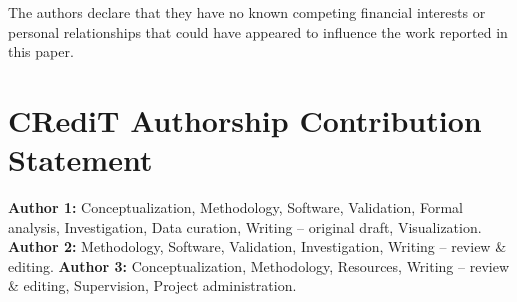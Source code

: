 \documentclass[12pt,a4paper]{article}
\begin{document}
The authors declare that they have no known competing financial interests or
personal relationships that could have appeared to influence the work reported
in this paper.

\section*{CRediT Authorship Contribution Statement}

\textbf{Author 1:} Conceptualization, Methodology, Software, Validation,
Formal analysis, Investigation, Data curation, Writing -- original draft,
Visualization.
\textbf{Author 2:} Methodology, Software, Validation, Investigation,
Writing -- review \& editing.
\textbf{Author 3:} Conceptualization, Methodology, Resources, Writing --
review \& editing, Supervision, Project administration.
\end{document}
